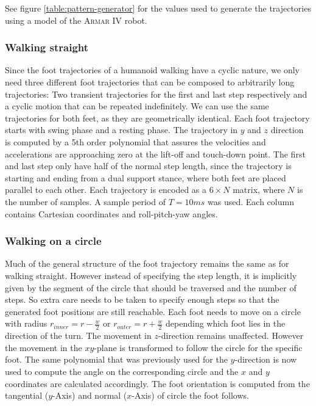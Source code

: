\documentclass[english,ngerman]{KITreprt}
\newcommand{\name}[1]{\textsc{#1}}
\begin{document}
See figure \ref{table:pattern-generator} for the values used to generate
the trajectories using a model of the \name{Armar IV} robot.

\subsubsection{Walking straight}\label{walking-straight}

Since the foot trajectories of a humanoid walking have a cyclic nature,
we only need three different foot trajectories that can be composed to
arbitrarily long trajectories: Two transient trajectories for the first
and last step respectively and a cyclic motion that can be repeated
indefinitely. We can use the same trajectories for both feet, as they
are geometrically identical. Each foot trajectory starts with swing
phase and a resting phase. The trajectory in $y$ and $z$ direction is
computed by a 5th order polynomial that assures the velocities and
accelerations are approaching zero at the lift-off and touch-down point.
The first and last step only have half of the normal step length, since
the trajectory is starting and ending from a dual support stance, where
both feet are placed parallel to each other. Each trajectory is encoded
as a $6 \times N$ matrix, where $N$ is the number of samples. A sample
period of $T = 10ms$ was used. Each column contains Cartesian
coordinates and roll-pitch-yaw angles.

\subsubsection{Walking on a circle}\label{walking-on-a-circle}

Much of the general structure of the foot trajectory remains the same as
for walking straight. However instead of specifying the step length, it
is implicitly given by the segment of the circle that should be
traversed and the number of steps. So extra care needs to be taken to
specify enough steps so that the generated foot positions are still
reachable. Each foot needs to move on a circle with radius
$r_{inner} = r - \frac{w}{2}$ or $r_{outer} = r + \frac{w}{2}$ depending
which foot lies in the direction of the turn. The movement in
$z$-direction remains unaffected. However the movement in the $xy$-plane
is transformed to follow the circle for the specific foot. The same
polynomial that was previously used for the $y$-direction is now used to
compute the angle on the corresponding circle and the $x$ and $y$
coordinates are calculated accordingly. The foot orientation is computed
from the tangential ($y$-Axis) and normal ($x$-Axis) of circle the foot
follows.
\end{document}
